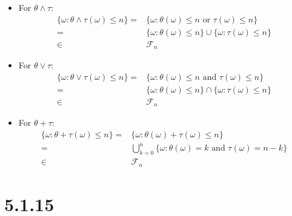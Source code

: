 \documentclass[11pt,a4paper]{ctexart}
\numberwithin{equation}{section}%
\newcommand{\F}{\mathcal{F}}
\begin{document}
\begin{itemize}[topsep=2pt,itemsep=0pt]
    \item For $ \theta \wedge \tau $:
    \begin{align*}
        \{\omega : \theta \wedge \tau(\omega )\leq n\} =& \{\omega : \theta(\omega )\leq n \text{ or } \tau(\omega )\leq n\} \\
        =& \{\omega : \theta(\omega )\leq n\} \cup \{\omega : \tau(\omega )\leq n\} \\
        \in & \F_n  
    \end{align*}
    \item For $ \theta \vee \tau $:
    \begin{align*}
        \{\omega : \theta \vee \tau(\omega )\leq n\} =& \{\omega : \theta(\omega )\leq n \text{ and } \tau(\omega )\leq n\} \\
        =& \{\omega : \theta(\omega )\leq n\} \cap \{\omega : \tau(\omega )\leq n\} \\
        \in & \F_n 
    \end{align*}
    \item For $ \theta +\tau $:
    \begin{align*}
        \{\omega : \theta +\tau(\omega )\leq n\} =& \{\omega : \theta(\omega )+ \tau(\omega )\leq n\} \\
        =& \bigcup_{k=0}^n \{\omega : \theta(\omega )=k \text{ and } \tau(\omega )=n-k\} \\
        \in & \F_n
    \end{align*}
\end{itemize}

\section{5.1.15}

\subsection{}
\end{document}

